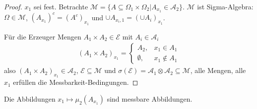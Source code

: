 \documentclass[]{article}
\begin{document}
\begin{proof}
	$x_1$ sei fest. Betrachte $\mathcal{M} = \{A\subseteq \Omega_1\times\Omega_2|A_{x_1}\in\mathcal{A}_2\}$. $\mathcal{M}$ ist Sigma-Algebra: $\Omega \in \mathcal{M}$, $(A_{x_1})^c = (A^c)_{x_1}$ und $\cup A_{x_i,1}=(\cup A_i)_{x_1}$.
	
	Für die Erzeuger Mengen $A_1\times A_2 \in \mathcal{E}$ mit $A_i \in \mathcal{A}_i$
	\begin{align*}
		(A_1\times A_2)_{x_1} = \begin{cases}
									A_2, & x_1 \in A_1\\
									\emptyset, & x_1 \notin A_1
								\end{cases}
	\end{align*}
	also $(A_1\times A_2)_{x_1} \in \mathcal{A}_2$, $\mathcal{E} \subseteq \mathcal{M}$ und $\sigma(\mathcal{E}) = \mathcal{A}_1 \otimes \mathcal{A}_2 \subseteq \mathcal{M}$, alle Mengen, alle $x_1$ erfüllen die Messbarkeit-Bedingungen.
\end{proof}

Die Abbildungen $x_1 \mapsto \mu_2(A_{x_1})$ sind messbare Abbildungen.
\end{document}
